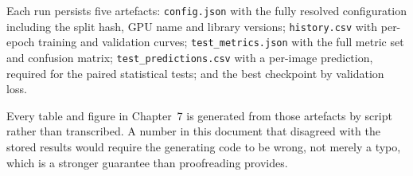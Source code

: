 Each run persists five artefacts: \texttt{config.json} with the fully resolved
configuration including the split hash, GPU name and library versions;
\texttt{history.csv} with per-epoch training and validation curves;
\texttt{test\_metrics.json} with the full metric set and confusion matrix;
\texttt{test\_predictions.csv} with a per-image prediction, required for the paired
statistical tests; and the best checkpoint by validation loss.

Every table and figure in Chapter~7 is generated from those artefacts by script rather
than transcribed. A number in this document that disagreed with the stored results would
require the generating code to be wrong, not merely a typo, which is a stronger guarantee
than proofreading provides.
